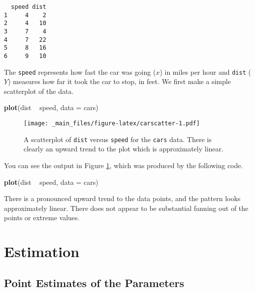 \documentclass[]{book}
\newenvironment{Shaded}{\begin{snugshade}}{\end{snugshade}}
\newcommand{\KeywordTok}[1]{\textcolor[rgb]{0.13,0.29,0.53}{\textbf{{#1}}}}
\newcommand{\DataTypeTok}[1]{\textcolor[rgb]{0.13,0.29,0.53}{{#1}}}
\newcommand{\StringTok}[1]{\textcolor[rgb]{0.31,0.60,0.02}{{#1}}}
\newcommand{\NormalTok}[1]{{#1}}
\numberwithin{equation}{chapter}
\numberwithin{figure}{chapter}
\theoremstyle{plain}
\theoremstyle{definition}
\theoremstyle{remark}
\theoremstyle{definition}
\theoremstyle{definition}
\theoremstyle{remark}
\begin{document}
\begin{verbatim}
  speed dist
1     4    2
2     4   10
3     7    4
4     7   22
5     8   16
6     9   10
\end{verbatim}

The \texttt{speed} represents how fast the car was going (\(x\)) in
miles per hour and \texttt{dist} (\(Y\)) measures how far it took the
car to stop, in feet. We first make a simple scatterplot of the data.

\begin{Shaded}
\begin{Highlighting}[]
\KeywordTok{plot}\NormalTok{(dist ~}\StringTok{ }\NormalTok{speed, }\DataTypeTok{data =} \NormalTok{cars)}
\end{Highlighting}
\end{Shaded}

\begin{figure}[htbp]
\centering
\texttt{[image: \_main\_files/figure-latex/carscatter-1.pdf]}
\caption{\label{fig:carscatter}\small A scatterplot of \texttt{dist} versus
\texttt{speed} for the \texttt{cars} data. There is clearly an upward
trend to the plot which is approximately linear.}
\end{figure}





You can see the output in Figure \ref{fig:carscatter}, which was
produced by the following code.

\begin{Shaded}
\begin{Highlighting}[]
\KeywordTok{plot}\NormalTok{(dist ~}\StringTok{ }\NormalTok{speed, }\DataTypeTok{data =} \NormalTok{cars)}
\end{Highlighting}
\end{Shaded}

There is a pronounced upward trend to the data points, and the pattern
looks approximately linear. There does not appear to be substantial
fanning out of the points or extreme values.

\section{Estimation}\label{sec-slr-estimation}

\subsection{Point Estimates of the
Parameters}\label{sub-point-estimate-mle-slr}
\end{document}
